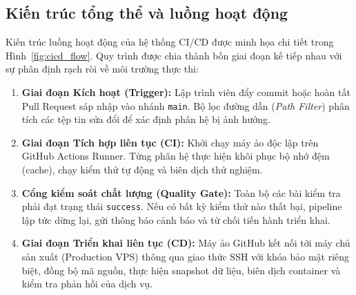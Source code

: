 \subsection{Kiến trúc tổng thể và luồng hoạt động}

Kiến trúc luồng hoạt động của hệ thống CI/CD được minh họa chi tiết trong Hình~\ref{fig:cicd_flow}. Quy trình được chia thành bốn giai đoạn kế tiếp nhau với sự phân định rạch ròi về môi trường thực thi:
\begin{enumerate}
    \item \textbf{Giai đoạn Kích hoạt (Trigger):} Lập trình viên đẩy commit hoặc hoàn tất Pull Request sáp nhập vào nhánh \texttt{main}. Bộ lọc đường dẫn (\textit{Path Filter}) phân tích các tệp tin sửa đổi để xác định phân hệ bị ảnh hưởng.
    \item \textbf{Giai đoạn Tích hợp liên tục (CI):} Khởi chạy máy ảo độc lập trên GitHub Actions Runner. Từng phân hệ thực hiện khôi phục bộ nhớ đệm (cache), chạy kiểm thử tự động và biên dịch thử nghiệm.
    \item \textbf{Cổng kiểm soát chất lượng (Quality Gate):} Toàn bộ các bài kiểm tra phải đạt trạng thái \texttt{success}. Nếu có bất kỳ kiểm thử nào thất bại, pipeline lập tức dừng lại, gửi thông báo cảnh báo và từ chối tiến hành triển khai.
    \item \textbf{Giai đoạn Triển khai liên tục (CD):} Máy ảo GitHub kết nối tới máy chủ sản xuất (Production VPS) thông qua giao thức SSH với khóa bảo mật riêng biệt, đồng bộ mã nguồn, thực hiện snapshot dữ liệu, biên dịch container và kiểm tra phản hồi của dịch vụ.
\end{enumerate}
